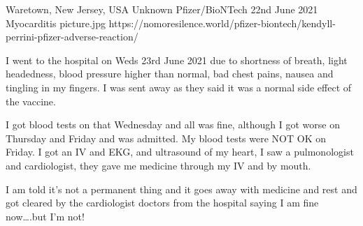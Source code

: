 {Waretown, New Jersey, USA}
{Unknown}
{Pfizer/BioNTech }
{22nd June 2021}
{Myocarditis}
{picture.jpg}
{https://nomoresilence.world/pfizer-biontech/kendyll-perrini-pfizer-adverse-reaction/}
{

I went to the hospital on Weds 23rd June 2021 due to shortness of breath, light
headedness, blood pressure higher than normal, bad chest pains, nausea and
tingling in my fingers. I was sent away as they said it was a normal side effect
of the vaccine.

I got blood tests on that Wednesday and all was fine, although I got worse on
Thursday and Friday and was admitted. My blood tests were NOT OK on Friday. I
got an IV and EKG, and ultrasound of my heart, I saw a pulmonologist and
cardiologist, they gave me medicine through my IV and by mouth.

I am told it’s not a permanent thing and it goes away with medicine and rest and
got cleared by the cardiologist doctors from the hospital saying I am fine
now….but I’m not!

}
